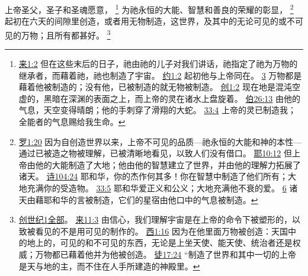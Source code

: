 \documentclass[12pt, a4paper, oneside]{ctexart}
\newcounter{parnum}[section]
\newcommand{\N}{%
   \noindent\refstepcounter{parnum}%
    \makebox[\parindent][l]{\textbf{\arabic{parnum}.}}}
\begin{document}
\N 上帝圣父，圣子和圣魂愿意，
	\footnote {
		\href{https://biblehub.com/hebrews/1-2.htm}{来1:2} 但在这些末后的日子，祂由祂的儿子对我们讲话，祂指定了祂为万物的继承者，而藉着祂，祂也制造了宇宙。
		\href{https://biblehub.com/john/1-2.htm}{约1:2} 起初他与上帝同在。
		\href{https://biblehub.com/john/1-3.htm}{3} 万物都是藉着他被制造的；没有他，已被制造的就无物被制造。
		\href{https://biblehub.com/genesis/1-2.htm}{创1:2} 现在地是混沌空虚的，黑暗在深渊的表面之上，而上帝的灵在诸水上盘旋着。
		\href{https://biblehub.com/job/26-13.htm}{伯26:13} 由他的气息，天空变得晴朗；他的手刺穿了滑翔的大蛇。
		\href{https://biblehub.com/job/33-4.htm}{33:4} 上帝的灵已制造我；全能者的气息赐给我生命。
	}
	为祂永恒的大能、智慧和善良的荣耀的彰显，
	\footnote {
		\href{https://biblehub.com/romans/1-20.htm}{罗1:20} 因为自创造世界以来，上帝不可见的品质---祂永恒的大能和神的本性---通过已被造之物被理解，已被清晰地看见，以致人们没有借口。
		\href{https://biblehub.com/jeremiah/10-12.htm}{耶10:12} 但上帝由他的大能制造了大地；他由他的智慧建立了世界，并由他的理解力拓展了诸天。
		\href{https://biblehub.com/psalms/104-24.htm}{诗104:24} 耶和华，你的杰作何其多！你在智慧中制造了他们所有；大地充满你的受造物。
		\href{https://biblehub.com/psalms/33-5.htm}{33:5} 耶和华爱正义和公义；大地充满他不衰的爱。
		\href{https://biblehub.com/psalms/33-6.htm}{6} 诸天由藉耶和华的言被制造，它们的星宿由他口中的气息被制造。
	}
	起初在六天的间隙里创造，或者用无物制造，这世界，及其中的无论可见的或不可见的万物；且所有都甚好。
	\footnote {
		\href{https://biblehub.com/niv/genesis/1.htm}{创世纪1全部}。
		\href{https://biblehub.com/hebrews/11-3.htm}{来11:3} 由信心，我们理解宇宙是在上帝的命令下被塑形的，以致被看见的不是用可见的制作的。
		\href{https://biblehub.com/colossians/1-16.htm}{西1:16} 因为在他里面万物被创造：天国中的地上的，可见的和不可见的东西，无论是上坐天使、能天使、统治者还是权威；万物都已藉着他并为他被创造。
		\href{https://biblehub.com/acts/17-24.htm}{徒17:24} “制造了世界和其中一切的上帝是天与地的主，而不住在人手所建造的神殿里。
	}
\end{document}
